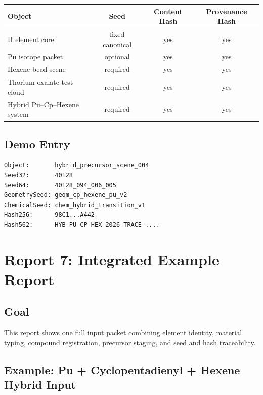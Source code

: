 \documentclass[11pt, a4paper, oneside]{article}
\begin{document}
\begin{center}
\small
\begin{tabular}{@{} l c c c @{}}
\toprule
\textbf{Object} & \textbf{Seed} & \textbf{Content Hash} & \textbf{Provenance Hash}\\
\midrule
H element core                & fixed canonical & yes & yes\\
Pu isotope packet             & optional        & yes & yes\\
Hexene bead scene             & required        & yes & yes\\
Thorium oxalate test cloud    & required        & yes & yes\\
Hybrid Pu--Cp--Hexene system  & required        & yes & yes\\
\bottomrule
\end{tabular}
\end{center}

\subsection{Demo Entry}

\begin{lstlisting}[language={}, caption={Seed and hash block for hybrid scene}]
Object:       hybrid_precursor_scene_004
Seed32:       40128
Seed64:       40128_094_006_005
GeometrySeed: geom_cp_hexene_pu_v2
ChemicalSeed: chem_hybrid_transition_v1
Hash256:      98C1...A442
Hash562:      HYB-PU-CP-HEX-2026-TRACE-....
\end{lstlisting}


\section{Report 7: Integrated Example Report}
\label{sec:report7}

\subsection{Goal}

This report shows one full input packet combining element identity, material
typing, compound registration, precursor staging, and seed and hash
traceability.

\subsection{Example: Pu + Cyclopentadienyl + Hexene Hybrid Input}
\end{document}
